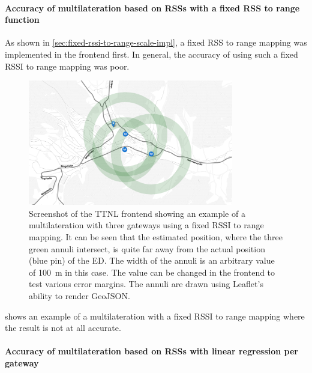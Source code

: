 \paragraph{Accuracy of multilateration based on \aclp{RSS} with a fixed \acl{RSS} to range function}\label{subsubsec:conclusion-rssi-fixed-scale}

As shown in \cref{sec:fixed-rssi-to-range-scale-impl}, a fixed \ac{RSS} to range mapping was implemented in the frontend first.
In general, the accuracy of using such a fixed \ac{RSSI} to range mapping was poor.

\begin{figure}[htbp]
    \centering
    \includegraphics[width=0.8\textwidth]{pictures/ttn-locator/frontend/multilateration/rssi_range_multilateration_bad_example.png}
    \caption{
        Screenshot of the \ac{TTNL} frontend showing an example of a multilateration with three gateways using a fixed \ac{RSSI} to range mapping.
        It can be seen that the estimated position, where the three green annuli intersect, is quite far away from the actual position (blue pin) of the \acl{ED}.
        The width of the annuli is an arbitrary value of \SI{100}{\meter} in this case.
        The value can be changed in the frontend to test various error margins.
        The annuli are drawn using Leaflet's ability to render GeoJSON.
    }\label{pic:bad-rssi-to-range-multilateration-example}
\end{figure}

 shows an example of a multilateration with a fixed \ac{RSSI} to range mapping where the result is not at all accurate.

\paragraph{Accuracy of multilateration based on \aclp{RSS} with linear regression per gateway}\label{subsubsec:conclusion-rssi-linear-regression}

